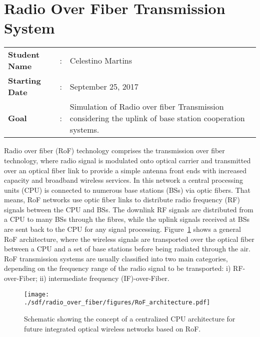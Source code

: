 \clearpage
\section{Radio Over Fiber Transmission System}

\begin{tcolorbox}	
\begin{tabular}{p{2.75cm} p{0.2cm} p{10.5cm}} 	
\textbf{Student Name}  &:& Celestino Martins\\
\textbf{Starting Date} &:& September 25, 2017\\
\textbf{Goal}          &:& Simulation of Radio over fiber Transmission considering the uplink of base station cooperation systems.
\end{tabular}
\end{tcolorbox}

Radio over fiber (RoF) technology comprises the transmission over fiber technology, where radio signal is modulated onto optical carrier and transmitted over an optical fiber link to provide a simple antenna front ends with increased capacity and broadband wireless services.  In this network a central processing units (CPU) is connected to numerous base stations (BSs) via optic fibers. That means, RoF networks use optic fiber links to distribute radio frequency (RF) signals between the CPU and BSs. The downlink RF signals are distributed from a CPU to many BSs through the fibres, while the uplink signals received at BSs are sent back to the CPU for any signal processing. Figure~\ref{fig_RoFarch} shows a general RoF architecture, where the wireless signals are transported over the optical fiber between a CPU and a set of base stations before being radiated through the air. RoF transmission systems are usually classified into two main categories, depending on the frequency range of the radio signal to be transported: i) RF-over-Fiber; ii) intermediate frequency (IF)-over-Fiber.

\begin{figure}[h!]
    \centering
    \texttt{[image: ./sdf/radio\_over\_fiber/figures/RoF\_architecture.pdf]}
    \caption{Schematic showing the concept of a centralized CPU architecture for future integrated optical wireless networks based on RoF.}
    \label{fig_RoFarch}
\end{figure}

